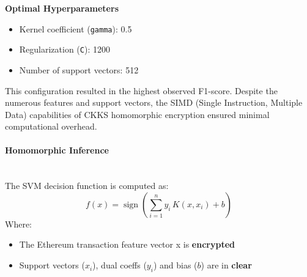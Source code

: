 \documentclass[article]{iacrtrans}
\begin{document}
\textbf{Optimal Hyperparameters}
\begin{itemize}
    \item Kernel coefficient (\texttt{gamma}): 0.5
    \item Regularization (\texttt{C}): 1200
    \item Number of support vectors: 512
\end{itemize}

This configuration resulted in the highest observed F1-score. Despite the numerous features and support vectors, the SIMD (Single Instruction, Multiple Data) capabilities of CKKS homomorphic encryption ensured minimal computational overhead.

\paragraph{Homomorphic Inference}\mbox{}\\
The SVM decision function is computed as:
\[
f(x) = \operatorname{sign} \left( \sum_{i=1}^{n} y_i \, K(x, x_i) + b \right)
\]
Where:
\begin{itemize}
    \item The Ethereum transaction feature vector x is \textbf{encrypted}
    \item Support vectors ($x_i$), dual coeffs ($y_i$) and bias ($b$) are in \textbf{clear}
\end{itemize}
\end{document}

